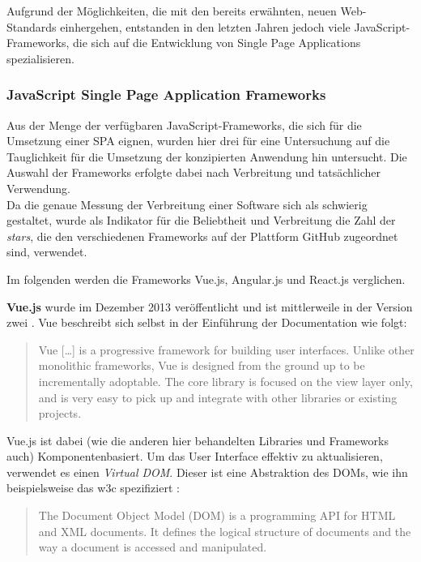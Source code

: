Aufgrund der Möglichkeiten, die mit den bereits erwähnten, neuen Web-Standards einhergehen, entstanden in den letzten Jahren jedoch viele JavaScript-Frameworks, die sich auf die Entwicklung von Single Page Applications spezialisieren.


\subsubsection{JavaScript Single Page Application Frameworks}

Aus der Menge der verfügbaren JavaScript-Frameworks, die sich für die Umsetzung einer SPA eignen, wurden hier drei für eine Untersuchung auf die Tauglichkeit für die Umsetzung der konzipierten Anwendung hin untersucht.
Die Auswahl der Frameworks erfolgte dabei nach Verbreitung und tatsächlicher Verwendung.\\
Da die genaue Messung der Verbreitung einer Software sich als schwierig gestaltet, wurde als Indikator für die Beliebtheit und Verbreitung die Zahl der \textit{stars}\footnotemark{}, die den verschiedenen Frameworks auf der Plattform GitHub  zugeordnet sind, verwendet.


Im folgenden werden die Frameworks Vue.js, Angular.js und React.js verglichen.

\textbf{Vue.js}\cite{vue} wurde im Dezember 2013 veröffentlicht und ist mittlerweile in der Version zwei .
Vue beschreibt sich selbst in der Einführung der Documentation wie folgt:

\begin{quote}
  Vue […] is a progressive framework for building user interfaces. Unlike other monolithic frameworks, Vue is designed from the ground up to be incrementally adoptable. The core library is focused on the view layer only, and is very easy to pick up and integrate with other libraries or existing projects. \cite{VueIntro}
\end{quote}

Vue.js ist dabei (wie die anderen hier behandelten Libraries und Frameworks auch) Komponentenbasiert. Um das User Interface effektiv zu aktualisieren, verwendet es einen \textit{Virtual DOM}. Dieser ist eine Abstraktion des DOMs, wie ihn beispielsweise das w3c spezifiziert \cite{w3cDOM}:

\begin{quote}
  The Document Object Model (DOM) is a programming API for HTML and XML documents. It defines the logical structure of documents and the way a document is accessed and manipulated.
\end{quote}

